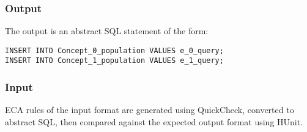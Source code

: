 \documentclass[12pt]{report}
\begin{document}
\vspace{-12pt}\subsubsection*{Output}

The output is an abstract SQL statement of the form:
\begin{verbatim}
INSERT INTO Concept_0_population VALUES e_0_query;
INSERT INTO Concept_1_population VALUES e_1_query;
\end{verbatim}

\vspace{-12pt}\subsubsection*{Input}

ECA rules of the input format are generated using QuickCheck, converted to
  abstract SQL, then compared against the expected output format using HUnit.





\end{document}

